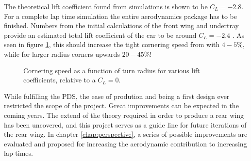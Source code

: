   The theoretical lift coefficient found from simulations is shown to be $C_L = -2.8$. For a complete lap time simulation the entire aerodynamics package has to be finished. Numbers from the initial calculations of the front wing and undertray provide an estimated total lift coefficient of the car to be around $C_L = -2.4$ \cite{CLvalues}. As seen in figure \ref{fig:cornerspeedvsliftrelative}, this should increase the tight cornering speed from with $4-5\%$, while for larger radius corners upwards $20-45\%$!

  \begin{figure}
    \caption{Cornering speed as a function of turn radius for various lift coefficients, relative to a $C_L = 0$.}
    \label{fig:cornerspeedvsliftrelative}
  \end{figure}

  While fulfilling the PDS, the ease of prodution and being a first design ever restricted the scope of the project. Great improvements can be expected in the coming years. The extend of the theory required in order to produce a rear wing has been uncovered, and this project serves as a guide line for future iterations of the rear wing.  In chapter \ref{chap:perspective}, a series of possible improvements are evaluated and proposed for increasing the aerodynamic contribution to increasing lap times.
